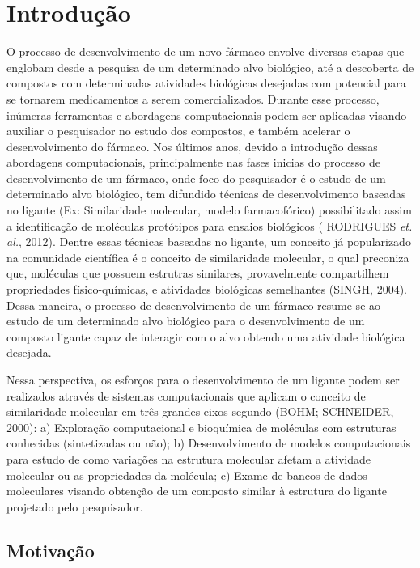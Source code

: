 \chapter{Introdu\c{c}\~ao}
O processo de desenvolvimento de um novo fármaco envolve diversas etapas que englobam desde a pesquisa de um determinado alvo biológico, até a descoberta de compostos com determinadas atividades biológicas desejadas com potencial para se tornarem medicamentos a serem comercializados. Durante esse processo, inúmeras ferramentas e abordagens computacionais podem ser aplicadas visando auxiliar o pesquisador no estudo dos compostos, e também acelerar o desenvolvimento do fármaco. Nos últimos anos, devido a introdução dessas abordagens computacionais, principalmente nas fases inicias do processo de desenvolvimento de um fármaco, onde  foco do pesquisador é o estudo de um determinado alvo biológico,  tem difundido técnicas de desenvolvimento baseadas no ligante (Ex: Similaridade molecular, modelo farmacofórico) possibilitado assim a identificação de moléculas protótipos para ensaios biológicos ( RODRIGUES {\it et. al.}, 2012). Dentre essas técnicas baseadas no ligante, um conceito já popularizado na comunidade científica é o conceito de similaridade molecular, o qual preconiza que, moléculas que possuem estrutras similares, provavelmente compartilhem propriedades físico-químicas, e atividades biológicas semelhantes (SINGH, 2004). Dessa maneira, o processo de desenvolvimento de um fármaco resume-se ao estudo de um determinado alvo biológico para o desenvolvimento de um composto ligante capaz de interagir com o alvo obtendo uma atividade biológica desejada.

Nessa perspectiva, os esforços para o desenvolvimento de um ligante podem ser realizados através de sistemas computacionais que aplicam o conceito de similaridade molecular em três grandes eixos segundo (BOHM; SCHNEIDER, 2000): a) Exploração computacional e bioquímica de moléculas com estruturas conhecidas (sintetizadas ou não); b) Desenvolvimento de modelos computacionais para estudo de como variações na estrutura molecular afetam a atividade molecular ou as propriedades da molécula; c) Exame de bancos de dados moleculares visando obtenção de um composto similar à estrutura do ligante projetado pelo pesquisador.             

\section{Motiva\c{c}\~ao}

